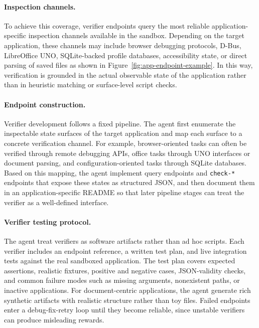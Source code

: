 \paragraph{Inspection channels.} To achieve this coverage, verifier endpoints query the most reliable
application-specific inspection channels available in the sandbox. Depending on
the target application, these channels may include browser debugging protocols,
D-Bus, LibreOffice UNO, SQLite-backed profile databases, accessibility state,
or direct parsing of saved files as shown in Figure~\ref{fig:app-endpoint-example}. In this way, verification is grounded in the
actual observable state of the application rather than in heuristic matching or
surface-level script checks.

\paragraph{Endpoint construction.} Verifier development follows a fixed pipeline. The agent first enumerate the inspectable state surfaces of the target application and map each surface to a
concrete verification channel. For example, browser-oriented tasks can often be
verified through remote debugging APIs, office tasks through UNO interfaces or
document parsing, and configuration-oriented tasks through SQLite databases. Based on this mapping, the agent implement query endpoints and
\texttt{check-*} endpoints that expose these states as structured JSON, and then
document them in an application-specific README so that later pipeline stages
can treat the verifier as a well-defined interface.

\paragraph{Verifier testing protocol.} The agent treat verifiers as software artifacts rather than ad hoc scripts. Each verifier includes an endpoint reference, a written test plan, and live integration tests against the real sandboxed application. The test plan covers expected assertions, realistic fixtures, positive and negative cases, JSON-validity checks, and common failure modes such as missing arguments, nonexistent paths, or inactive applications. For document-centric applications, the agent generate rich synthetic artifacts with realistic structure rather than toy files. Failed endpoints enter a debug-fix-retry loop until they become reliable, since unstable verifiers can produce misleading rewards.


